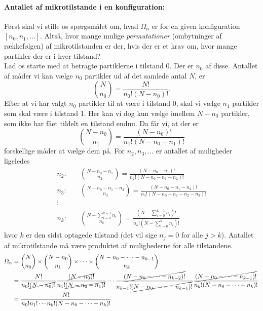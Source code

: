 \paragraph{Antallet af mikrotilstande i en konfiguration:} Først skal vi stille os spørgsmålet om, hvad $\Omega_n$ er for en given konfiguration $[n_0,n_1,\dots]$. Altså, hvor mange mulige \emph{permutationer} (ombytninger af rækkefølgen) af mikrotilstanden er der, hvis der er et krav om, hvor mange partikler der er i hver tilstand?\\
\indent Lad os starte med at betragte partiklerne i tilstand 0. Der er $n_0$ af disse. Antallet af måder vi kan vælge $n_0$ partikler ud af det samlede antal $N$, er
\[ \binom{N}{n_0}=\frac{N!}{n_0!(N-n_0)!}. \]
Efter at vi har valgt $n_0$ partikler til at være i tilstand 0, skal vi vælge $n_1$ partikler som skal være i tilstand 1. Her kan vi dog kun vælge imellem $N-n_0$ partikler, som ikke har fået tildelt en tilstand endnu. Da får vi, at der er
\[ \binom{N-n_0}{n_1}=\frac{(N-n_0)!}{n_1!(N-n_0-n_1)!} \]
forskellige måder at vælge dem på. For $n_2,n_3,\dots$ er antallet af muligheder ligeledes
\begin{equation*}
\begin{split}	
	n_2:\quad &\binom{N-n_0-n_1}{n_2}=\frac{(N-n_0-n_1)!}{n_2!(N-n_0-n_1-n_2)!}\\
	n_3:\quad &\binom{N-n_0-n_1-n_2}{n_3}=\frac{(N-n_0-n_1-n_2)!}{n_3!(N-n_0-n_1-n_2-n_3)!}\\
	\vdots\quad& \\
	n_k:\quad &\binom{N-\sum_{i=0}^{k-1} n_i}{n_k}=\frac{\left(N-\sum_{i=0}^{k-1}n_i\right)!}{n_k!\left(N-\sum_{i=0}^{k}n_i\right)!}
\end{split}
\end{equation*}
hvor $k$ er den sidst optagede tilstand (det vil sige $n_j=0$ for alle $j>k$). Antallet af mikrotilstande må være produktet af mulighederne for alle tilstandene.
\begin{equation*}
\begin{split}
	\Omega_n &=\binom{N}{n_0}\times \binom{N-n_0}{n_1}\times\cdots\times\binom{N-n_0-\cdots -n_{k-1}}{n_k}\\
	&=\frac{N!}{n_0!\cancel{(N-n_0)!}}\frac{\cancel{(N-n_0)!}}{n_1!\cancel{(N-n_0-n_1)!}}\cdots\frac{\cancel{(N-n_0-\cdots-n_{k-2})!}}{n_{k-1}!\cancel{(N-n_0-\cdots-n_{k-1})!}}\frac{\cancel{(N-n_0-\cdots-n_{k-1})!}}{n_{k}!(N-n_0-\cdots-n_{k})!}\\
	&=\frac{N!}{n_0!n_1!\cdots n_k! (N-n_0-\cdots -n_k)!}
\end{split}
\end{equation*}
